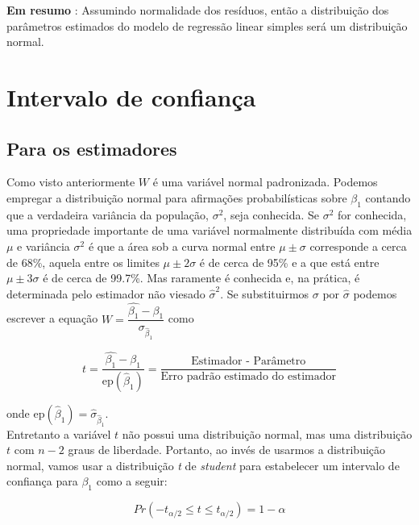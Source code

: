 \noindent \textbf{Em resumo} : Assumindo normalidade dos resíduos, então a distribuição dos parâmetros estimados do modelo de regressão linear simples será um distribuição normal.

\section{Intervalo de confiança}

\subsection{Para os estimadores}

\noindent Como visto anteriormente $W$ é uma variável normal padronizada. Podemos empregar a distribuição normal para afirmações probabilísticas sobre $\beta_1$ contando que a verdadeira variância da população, $\sigma^2$, seja conhecida. Se $\sigma^2$ for conhecida, uma propriedade importante de uma variável normalmente distribuída com média $\mu$  e variância $\sigma^2$ é que a área sob a curva normal entre $\mu \pm \sigma$ corresponde a cerca de 68\%, aquela entre os limites $\mu \pm 2\sigma$ é de cerca de 95\% e a que está entre $\mu \pm 3\sigma$ é de cerca de 99.7\%. Mas raramente é conhecida e, na prática, é determinada pelo estimador não viesado $\hat{\sigma}^2$. Se substituirmos $\sigma$ por $\hat{\sigma}$ podemos escrever a equação
$W = \dfrac{\hat{\beta_1} - \beta_1}{\sigma_{\hat{\beta}_1}}$ como 

\begin{equation}
\label{eq:vart}
    t = \dfrac{\hat{\beta_1} - \beta_1}{\text{ep}(\hat{\beta}_1)} = \dfrac{\text{Estimador - Parâmetro}}{\text{Erro padrão estimado do estimador}}
\end{equation}

\noindent onde $\text{ep}(\hat{\beta}_1) = \hat{\sigma}_{\hat{\beta}_1}$.\\

\noindent Entretanto a variável $t$ não possui uma distribuição normal, mas uma distribuição $t$ com $n-2$ graus de liberdade. Portanto, ao invés de usarmos a distribuição normal, vamos usar a distribuição \textit{t} de \textit{student} para estabelecer um intervalo de confiança para $\beta_1$ como a seguir:

\begin{equation}
\label{eq:interv}
    Pr(-t_{\alpha/2} \leq t \leq t_{\alpha/2}) = 1 - \alpha
\end{equation}

